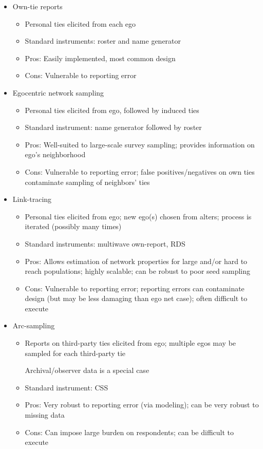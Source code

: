 \documentclass[]{book}
\theoremstyle{definition}
\theoremstyle{definition}
\theoremstyle{definition}
\theoremstyle{remark}
\begin{document}
\begin{itemize} 
\item Own-tie reports 
\begin{itemize}
\item Personal ties elicited from each ego 
\item Standard instruments: roster and name generator 
\item Pros: Easily implemented, most common design 
\item Cons: Vulnerable to reporting error 
\end{itemize}
\item Egocentric network sampling 
\begin{itemize}
\item Personal ties elicited from ego, followed by induced ties 
\item Standard instrument: name generator followed by roster 
\item Pros: Well-suited to large-scale survey sampling; provides information 
on ego's neighborhood 
\item Cons: Vulnerable to reporting error; false positives/negatives on own 
ties contaminate sampling of neighbors' ties
\end{itemize}
\item Link-tracing 
\begin{itemize}
\item Personal ties elicited from ego; new ego(s) chosen from alters; process is iterated 
(possibly many times) 
\item Standard instruments: multiwave own-report, RDS 
\item Pros: Allows estimation of network properties for large and/or hard to reach 
populations; highly scalable; can be robust to poor seed sampling 
\item Cons: Vulnerable to reporting error; reporting errors can contaminate design (but may 
be less damaging than ego net case); often difficult to execute 
\end{itemize}
\item Arc-sampling 
\begin{itemize}
\item Reports on third-party ties elicited from ego; multiple egos may be sampled for each 
third-party tie 

\indent Archival/observer data is a special case 

\item Standard instrument: CSS 
\item Pros: Very robust to reporting error (via modeling); can be very robust to missing data 
\item Cons: Can impose large burden on respondents; can be difficult to execute
\end{itemize}
\end{itemize}
\end{document}
